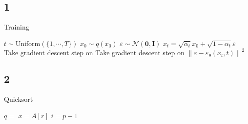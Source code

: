 \documentclass[
  letterpaper,
  DIV=11,
  numbers=noendperiod]{scrartcl}
\author{}
\date{}
\begin{document}

\subsection{1}\label{section}

\begin{algorithm}[htb!]
\caption{Training}
\label{alg-test-text-style}
\begin{algorithmic}[1]
\Repeat
  \State $t\sim \text{Uniform}(\lbrace 1,\cdots,T \rbrace)$ 
  \State $x_0\sim q(x_0)$
  \State $\varepsilon\sim \mathcal{N}(\mathbf{0},\mathbf{I})$
  \State $x_t = \sqrt{\overline{\alpha}_t}x_0 + \sqrt{1-\overline{\alpha}_t}\varepsilon$
  \State Take gradient descent step on 
  \State Take gradient descent step on
  $\left\lVert \varepsilon - \varepsilon_{\theta}(x_t,t) \right\rVert^2$
\end{algorithmic}
\end{algorithm}

\subsection{2}\label{section-1}

\begin{algorithm}
\caption{Quicksort}
\begin{algorithmic}[1]
    \State $q = $ 
    \State {}
    \State {}
  \EndIf
\EndFunction
{}
  \State $x = A[r]$
  \State $i = p - 1$
\EndFunction
\end{algorithmic}
\end{algorithm}
\end{document}
